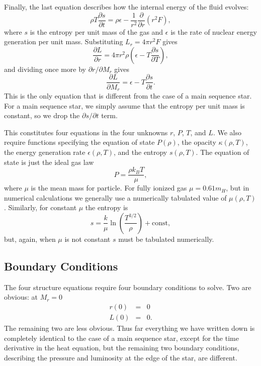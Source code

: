 Finally, the last equation describes how the internal energy of the fluid evolves:
\begin{equation}
\rho T\frac{\partial s}{\partial t} = \rho \epsilon - \frac{1}{r^2}\frac{\partial}{\partial r}(r^2 F),
\end{equation}
where $s$ is the entropy per unit mass of the gas and $\epsilon$ is the rate of nuclear energy generation per unit mass.  Substituting $L_r = 4 \pi r^2 F$ gives
\begin{equation}
\frac{\partial L}{\partial r} = 4\pi r^2 \rho \left(\epsilon - T\frac{\partial s}{\partial T}\right),
\end{equation}
and dividing once more by $\partial r/\partial M_r$ gives
\begin{equation}
\label{heat}
\frac{\partial L}{\partial M_r} = \epsilon - T\frac{\partial s}{\partial t}.
\end{equation}
This is the only equation that is different from the case of a main sequence star. For a main sequence star, we simply assume that the entropy per unit mass is constant, so we drop the $\partial s/\partial t$ term.

This constitutes four equations in the four unknowns $r$, $P$, $T$, and $L$.  We also require functions specifying the equation of state $P(\rho)$, the opacity $\kappa(\rho,T)$, the energy generation rate $\epsilon(\rho,T)$, and the entropy $s(\rho,T)$.
The equation of state is just the ideal gas law
\begin{equation}
P = \frac{\rho k_B T}{\mu},
\end{equation}
where $\mu$ is the mean mass for particle. For fully ionized gas $\mu=0.61 m_H$, but in numerical calculations we generally use a numerically tabulated value of $\mu(\rho, T)$. Similarly, for constant $\mu$ the entropy is
\begin{equation}
s = \frac{k}{\mu} \ln \left(\frac{T^{3/2}}{\rho}\right) + \mbox{const},
\end{equation}
but, again, when $\mu$ is not constant $s$ must be tabulated numerically.

\subsection{Boundary Conditions}

The four structure equations require four boundary conditions to solve. Two are obvious: at $M_r=0$
\begin{eqnarray}
r(0) & = & 0\\
L(0) & = & 0.
\end{eqnarray}
The remaining two are less obvious. Thus far everything we have written down is completely identical to the case of a main sequence star, except for the time derivative in the heat equation, but the remaining two boundary conditions, describing the pressure and luminosity at the edge of the star, are different.

